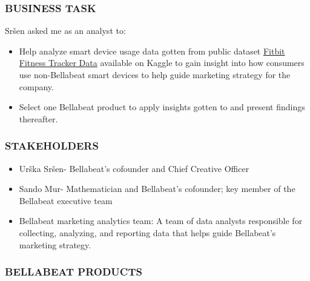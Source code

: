 \documentclass[
]{article}
\providecommand{\tightlist}{%
  \setlength{\itemsep}{0pt}\setlength{\parskip}{0pt}}
\begin{document}
\hypertarget{business-task}{%
\subsubsection{BUSINESS TASK}\label{business-task}}

Sršen asked me as an analyst to:

\begin{itemize}
\tightlist
\item
  Help analyze smart device usage data gotten from public dataset
  \href{(https://www.kaggle.com/datasets/arashnic/fitbit)}{Fitbit
  Fitness Tracker Data} available on Kaggle to gain insight into how
  consumers use non-Bellabeat smart devices to help guide marketing
  strategy for the company.
\item
  Select one Bellabeat product to apply insights gotten to and present
  findings thereafter.
\end{itemize}

\hypertarget{stakeholders}{%
\subsubsection{STAKEHOLDERS}\label{stakeholders}}

\begin{itemize}
\tightlist
\item
  Urška Sršen- Bellabeat's cofounder and Chief Creative Officer
\item
  Sando Mur- Mathematician and Bellabeat's cofounder; key member of the
  Bellabeat executive team
\item
  Bellabeat marketing analytics team: A team of data analysts
  responsible for collecting, analyzing, and reporting data that helps
  guide Bellabeat's marketing strategy.
\end{itemize}

\hypertarget{bellabeat-products}{%
\subsubsection{BELLABEAT PRODUCTS}\label{bellabeat-products}}
\end{document}
